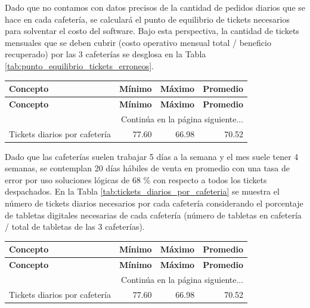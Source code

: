 Dado que no contamos con datos precisos de la cantidad de pedidos diarios que se hace en cada cafetería, se calculará el punto de equilibrio de tickets necesarios para solventar el costo del software. Bajo esta perspectiva, la cantidad de tickets mensuales que se deben cubrir (costo operativo mensual total / beneficio recuperado) por las 3 cafeterías se desglosa en la Tabla \ref{tab:punto_equilibrio_tickets_erroneos}.

\begingroup
\setlength{\LTleft}{\fill}
\setlength{\LTright}{\fill}

\begin{tabularx}{\textwidth}{X r r r}
\caption{Punto de equilibrio en tickets erróneos.} \label{tab:punto_equilibrio_tickets_erroneos}\\
\toprule
\textbf{Concepto} & \textbf{Mínimo} & \textbf{Máximo} & \textbf{Promedio} \\
\midrule
\endfirsthead

\toprule
\textbf{Concepto} & \textbf{Mínimo} & \textbf{Máximo} & \textbf{Promedio} \\
\midrule
\endhead

\midrule
\multicolumn{4}{r}{\small Continúa en la página siguiente...} \\
\endfoot
\bottomrule
\endlastfoot

Tickets diarios por cafetería & 77.60 & 66.98 & 70.52 \\
\end{tabularx}
\endgroup

Dado que las cafeterías suelen trabajar 5 días a la semana y el mes suele tener 4 semanas, se contemplan 20 días hábiles de venta en promedio con una tasa de error por uso soluciones lógicas de 68 \% con respecto a todos los tickets despachados. En la Tabla \ref{tab:tickets_diarios_por_cafeteria} se muestra el número de tickets diarios necesarios por cada cafetería considerando el porcentaje de tabletas digitales necesarias de cada cafetería (número de tabletas en cafetería / total de tabletas de las 3 cafeterías).

\begingroup
\setlength{\LTleft}{\fill}
\setlength{\LTright}{\fill}

\begin{tabularx}{\textwidth}{X r r r}
\caption{Tickets diarios por cafetería.} \label{tab:tickets_diarios_por_cafeteria}\\
\toprule
\textbf{Concepto} & \textbf{Mínimo} & \textbf{Máximo} & \textbf{Promedio} \\
\midrule
\endfirsthead

\toprule
\textbf{Concepto} & \textbf{Mínimo} & \textbf{Máximo} & \textbf{Promedio} \\
\midrule
\endhead

\midrule
\multicolumn{4}{r}{\small Continúa en la página siguiente...} \\
\endfoot
\bottomrule
\endlastfoot

Tickets diarios por cafetería & 77.60 & 66.98 & 70.52 \\
\end{tabularx}
\endgroup

